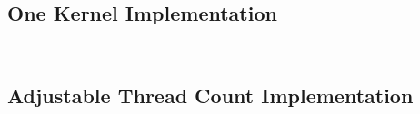 \documentclass[10pt]{article}
\begin{document}
\subsection{One Kernel Implementation}
\inputminted[linenos, fontsize=\footnotesize]{c}{../jacobi_final/1k_jacobi5.cu}
\inputminted[linenos, fontsize=\footnotesize]{c}{../jacobi_final/1k_jacobi6.cu}

\subsection{Adjustable Thread Count Implementation}
\inputminted[linenos, fontsize=\footnotesize]{c}{../jacobi_final/orig_J6M_v2.cu}
\inputminted[linenos, fontsize=\footnotesize]{c}{../jacobi_final/1k_J6M_v2.cu}
\end{document}
